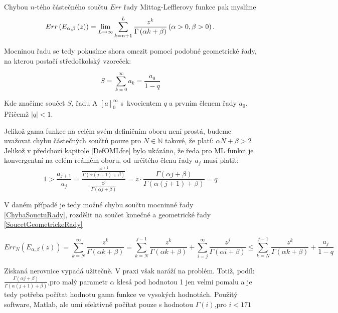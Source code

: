 \documentclass[a4paper,12pt,twoside]{article}
\theoremstyle{definition}
\newtheorem{defin}[veta]{Definice}
\theoremstyle{remark}
\numberwithin{equation}{section}
\numberwithin{table}{section}
\numberwithin{figure}{section}
\newcommand{\N}{\mathbb{N}}
\begin{document}
Chybou $n$-tého částečného součtu $Err$ řady Mittag-Lefflerovy funkce pak myslíme
\begin{equation} \label{ChybaSouctuRady}
	Err \left(E_{\alpha, \beta} \left( z\right)\right) = \lim_{L\to \infty} \sum_{k=n+1}^{L} \frac{z^{k}}{\Gamma\left( \alpha k +\beta \right)} \space \space \left( \alpha > 0, \beta > 0 \right).
\end{equation}

Mocninou řadu se tedy pokusíme shora omezit pomocí podobné geometrické řady, na kterou postačí středoškolský vzoreček:

\begin{equation}\label{SoucetGeometrickeRady}
	S = \sum_{k=0}^{\infty} a_{k} = \frac{a_{0}}{1-q}
\end{equation} 

Kde značíme součet $S$, řadu A $\left[a\right]_{0}^{\infty}$ s~kvocientem $q$ a prvním členem řady $a_0$. Přičemž $ |q| < 1$.

Jelikož gama funkce na celém svém definičním oboru není prostá, budeme uvažovat chybu částečných součtů pouze pro $N \in \N$ takové, že platí: $\alpha N + \beta > 2$
Jelikož v předchozí kapitole \ref{DefOMLfce} bylo ukázáno, že ředa pro ML funkci je konvergentní na celém reálném oboru, od určitého členu řady $a_j$ musí platit:
$$1 > \frac{ a_{j+1}}{a_{j}} = \frac{\frac{z^{j+1}}{\Gamma\left(\alpha \left(j+1\right) + \beta\right)}}{\frac{z^{j}}{\Gamma\left(\alpha j + \beta\right)}} = z \cdot \frac{\Gamma \left(\alpha j + \beta\right)}{\Gamma \left(\alpha \left(j+1\right) + \beta\right)} = q$$

V daném případě je tedy možné chybu součtu mocninné řady \eqref{ChybaSouctuRady}, rozdělit na součet konečné a geometrické řady \eqref{SoucetGeometrickeRady} 

$$	Err_{N} \left(E_{\alpha, \beta} \left( z\right)\right) = \sum_{k=N}^{\infty} \frac{z^{k}}{\Gamma\left( \alpha k + \beta \right)} = \sum_{k=N}^{j-1} \frac{z^{k}}{\Gamma\left( \alpha k + \beta \right)} +\sum_{i=j}^{\infty} \frac{z^{j}}{\Gamma\left( \alpha i + \beta \right)} \leq \sum_{k=N}^{j-1} \frac{z^{k}}{\Gamma\left( \alpha k + \beta \right)} + \frac{a_{j}}{1-q} $$

Získaná nerovnice vypadá užitečně. V praxi však naráží na problém.
Totiž, podíl: $\frac{\Gamma \left(\alpha j + \beta\right)}{\Gamma \left(\alpha \left(j+1\right) + \beta\right)}$,pro malý parametr $\alpha$ klesá pod hodnotou 1 jen velmi pomalu a je tedy potřeba počítat hodnotu gama funkce ve vysokých hodnotách. Použitý software, Matlab, ale umí efektivně počítat pouze s hodnotou $\Gamma(i)$,pro $i < 171$
\end{document}
